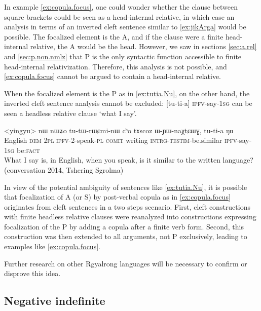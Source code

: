 \documentclass[oldfontcommands,oneside,a4paper,11pt]{article}
\newcommand{\ipa}[1]{{\phon #1}} %
\begin{document}
In example \ref{ex:copula.focus}, one could wonder whether the clause  between square brackets could be seen as a head-internal relative, in which case an analysis in terms of an inverted cleft sentence similar to \ref{ex:jikArga} would be possible. The focalized element is the A, and if the clause were a finite head-internal relative, the A would be the head. However, we saw in sections \ref{sec:a.rel} and \ref{sec:p.non.nmlz} that P is the only syntactic function accessible to finite head-internal relativization. Therefore, this analysis is not possible, and \ref{ex:copula.focus}  cannot be argued to contain a head-internal relative.

When the focalized element is the P as in  \ref{ex:tutia.Nu}, on the other hand, the inverted cleft sentence analysis cannot be excluded: [\ipa{tu-ti-a}] \textsc{ipfv}-say-\textsc{1sg} can be seen a headless relative clause `what I say'.  

\begin{exe}
\ex \label{ex:tutia.Nu}
\gll 
<yingyu>  	\ipa{nɯ}  	\ipa{nɯʑo}  	\ipa{tu-tɯ-rɯɕmi-nɯ}  	\ipa{cʰo}  	\ipa{tɤscoz}  	\ipa{ɯ-ɲɯ-naχtɕɯɣ,}  	\ipa{tu-ti-a} 	\ipa{ŋu}  \\
English \textsc{dem} \textsc{2pl} \textsc{ipfv}-2-speak-\textsc{pl} \textsc{comit} writing \textsc{intrg-testim}-be.similar \textsc{ipfv}-say-\textsc{1sg} be:\textsc{fact} \\
\glt What I say is, in English, when you speak, is it similar to the written language? (conversation 2014, Tshering Sgrolma)
\end{exe}

In view of the potential ambiguity of   sentences like \ref{ex:tutia.Nu}, it is possible that focalization of A (or S) by post-verbal copula as in \ref{ex:copula.focus} originates from cleft sentences in a two steps scenario. First,  cleft constructions with finite headless relative clauses were reanalyzed  into constructions expressing focalization of the P by adding a copula after a finite verb form. Second,  this construction was then extended to all arguments, not P exclusively, leading to examples like \ref{ex:copula.focus}.

Further research on other Rgyalrong languages will be necessary to confirm or disprove this idea. 


\subsection{Negative indefinite}
\end{document}
